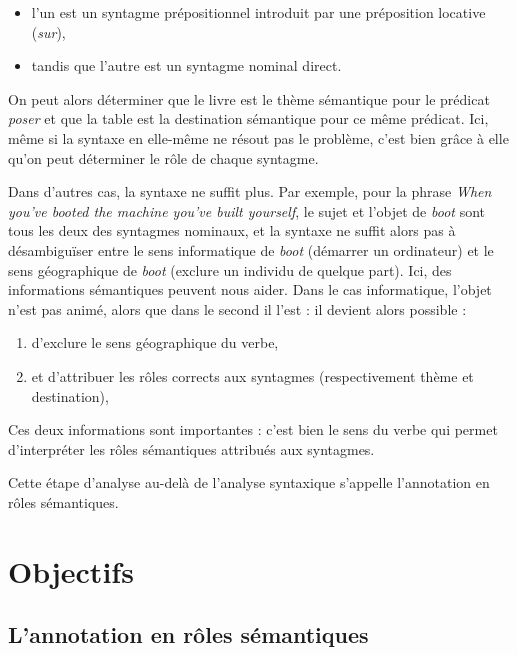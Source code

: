 \begin{itemize}
    \item l'un est un syntagme prépositionnel introduit par une préposition
        locative (\textit{sur}),
    \item tandis que l'autre est un syntagme nominal direct.
\end{itemize}

On peut alors déterminer que le livre est le thème sémantique pour le prédicat
\textit{poser} et que la table est la destination sémantique pour ce même
prédicat. Ici, même si la syntaxe en elle-même ne résout pas le problème, c'est
bien grâce à elle qu'on peut déterminer le rôle de chaque syntagme.

Dans d'autres cas, la syntaxe ne suffit plus. Par exemple, pour la phrase
\textit{When you've booted the machine you've built yourself}, le sujet et
l'objet de \textit{boot} sont tous les deux des syntagmes nominaux, et la syntaxe
ne suffit alors pas à désambiguïser entre le sens informatique de \textit{boot}
(démarrer un ordinateur) et le sens géographique de \textit{boot} (exclure un
individu de quelque part). Ici, des informations sémantiques peuvent nous
aider. Dans le cas informatique, l'objet n'est pas animé, alors que dans le
second il l'est : il devient alors possible :

\begin{enumerate}
    \item d'exclure le sens géographique du verbe,
    \item et d'attribuer les rôles corrects aux syntagmes (respectivement thème et
        destination),
\end{enumerate}


Ces deux informations sont importantes : c'est bien le sens du verbe qui permet
d'interpréter les rôles sémantiques attribués aux syntagmes.

Cette étape d'analyse au-delà de l'analyse syntaxique s'appelle l'annotation en
rôles sémantiques.

\section{Objectifs}

\subsection{L'annotation en rôles sémantiques}


